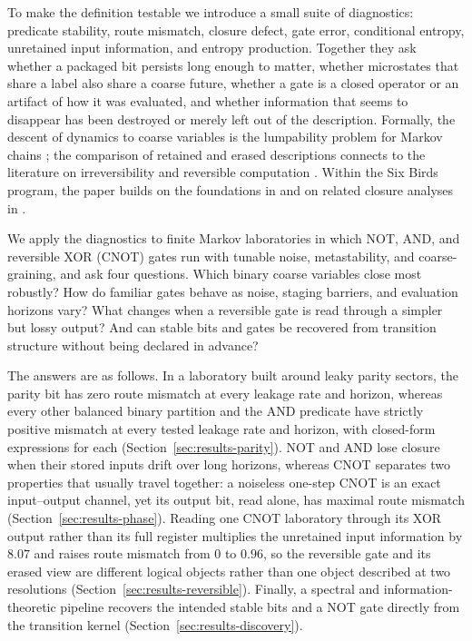 To make the definition testable we introduce a small suite of diagnostics: predicate stability, route mismatch, closure defect, gate error, conditional entropy, unretained input information, and entropy production. Together they ask whether a packaged bit persists long enough to matter, whether microstates that share a label also share a coarse future, whether a gate is a closed operator or an artifact of how it was evaluated, and whether information that seems to disappear has been destroyed or merely left out of the description. Formally, the descent of dynamics to coarse variables is the lumpability problem for Markov chains \cite{kemeny1976finite,buchholz1994lumpability,simonando1961aggregation,givon2004extracting}; the comparison of retained and erased descriptions connects to the literature on irreversibility and reversible computation \cite{landauer1961,bennett1973,bennett1982thermodynamics}. Within the Six Birds program, the paper builds on the foundations in \cite{tsiokos2026sixbirds} and on related closure analyses in \cite{tsiokos2026countstone,tsiokos2026minsubstrate}.

We apply the diagnostics to finite Markov laboratories in which NOT, AND, and reversible XOR (CNOT) gates run with tunable noise, metastability, and coarse-graining, and ask four questions. Which binary coarse variables close most robustly? How do familiar gates behave as noise, staging barriers, and evaluation horizons vary? What changes when a reversible gate is read through a simpler but lossy output? And can stable bits and gates be recovered from transition structure without being declared in advance?

The answers are as follows. In a laboratory built around leaky parity sectors, the parity bit has zero route mismatch at every leakage rate and horizon, whereas every other balanced binary partition and the AND predicate have strictly positive mismatch at every tested leakage rate and horizon, with closed-form expressions for each (Section~\ref{sec:results-parity}). NOT and AND lose closure when their stored inputs drift over long horizons, whereas CNOT separates two properties that usually travel together: a noiseless one-step CNOT is an exact input--output channel, yet its output bit, read alone, has maximal route mismatch (Section~\ref{sec:results-phase}). Reading one CNOT laboratory through its XOR output rather than its full register multiplies the unretained input information by \(8.07\) and raises route mismatch from \(0\) to \(0.96\), so the reversible gate and its erased view are different logical objects rather than one object described at two resolutions (Section~\ref{sec:results-reversible}). Finally, a spectral and information-theoretic pipeline recovers the intended stable bits and a NOT gate directly from the transition kernel (Section~\ref{sec:results-discovery}).

